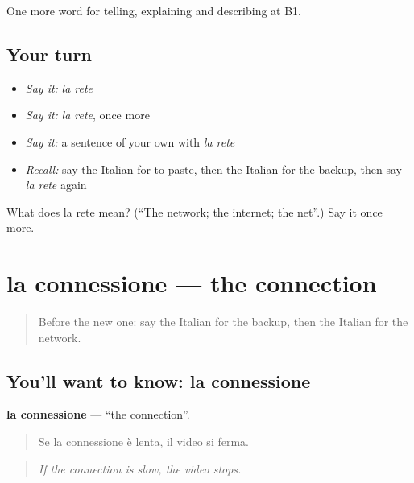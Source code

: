 \begin{grammarlens}[title={What you've built}]
One more word for telling, explaining and describing at B1.
\end{grammarlens}

\subsection*{Your turn}
\begin{itemize}
\raggedright
  \item \emph{Say it:} \emph{la rete}
  \item \emph{Say it:} \emph{la rete}, once more
  \item \emph{Say it:} a sentence of your own with \emph{la rete}
  \item \emph{Recall:} say the Italian for to paste, then the Italian for the backup, then say \emph{la rete} again
\end{itemize}

\begin{tcolorbox}[breakable,colback=teal!4,colframe=teal!35!black,title={Before you move on}]
What does la rete mean? (\textquotedblleft{}The network; the internet; the net\textquotedblright{}.) Say it once more.
\end{tcolorbox}
\section[la connessione]{la connessione — the connection}

\label{lesson:IT-C402-connessione}



\begin{quote}
Before the new one: say the Italian for the backup, then the Italian for the network.
\end{quote}

\subsection*{You'll want to know: la connessione}
\textbf{la connessione} — \textquotedblleft{}the connection\textquotedblright{}.

\begin{quote}
Se la connessione è lenta, il video si ferma.
\end{quote}

\begin{quote}
\emph{If the connection is slow, the video stops.}
\end{quote}

